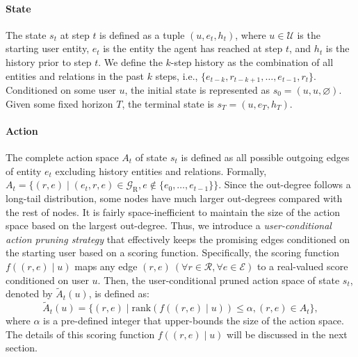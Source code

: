 \documentclass[sigconf]{acmart}
\begin{document}
\paragraph{State} 
The state $s_t$ at step $t$ is defined as a tuple $(u, e_t, h_t)$, where $u\in\mathcal{U}$ is the starting user entity, $e_t$ is the entity the agent has reached at step $t$, and $h_t$ is the history prior to step $t$. 
We define the $k$-step history as the combination of all entities and relations in the past $k$ steps, i.e., $\{e_{t-k},r_{t-k+1},\ldots,e_{t-1},r_t\}$.
Conditioned on some user $u$, the initial state is represented as $s_\text{0}=(u,u,\varnothing)$.
Given some fixed horizon $T$, the terminal state is $s_T=(u,e_T,h_T)$.

\paragraph{Action}
The complete action space $A_t$ of state $s_t$ is defined as all possible outgoing edges of entity $e_t$ excluding history entities and relations.
Formally, $A_t=\{(r,e) \mid (e_t,r,e)\in\mathcal{G}_{\text{R}}, e\not\in\{e_0,\ldots,e_{t-1}\}\}$. 
Since the out-degree follows a long-tail distribution, some nodes have much larger out-degrees compared with the rest of nodes.
It is fairly space-inefficient to maintain the size of the action space based on the largest out-degree. 
Thus, we introduce a \emph{user-conditional action pruning strategy} that effectively keeps the promising edges conditioned on the starting user based on a scoring function.
Specifically, the scoring function $f((r,e) \mid u)$ maps any edge $(r,e) ~(\forall r\in\mathcal{R}, \forall e \in\mathcal{E})$ to a real-valued score conditioned on user $u$.
Then, the user-conditional pruned action space of state $s_t$, denoted by $\tilde{A}_{t}(u)$, is defined as:
\begin{equation}\label{eq:act}
\tilde{A}_{t}(u)=\{(r,e) \mid \text{rank}(f((r,e) \mid u))\le\alpha,(r,e)\in A_t\},
\end{equation}
where $\alpha$ is a pre-defined integer that upper-bounds the size of the action space.
The details of this scoring function $f((r,e) \mid u)$ will be discussed in the next section.
\end{document}
